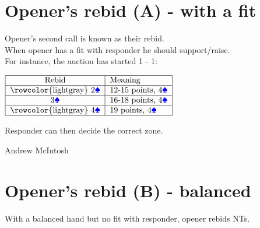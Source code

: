 \documentclass[14pt]{extarticle}
\begin{document}
\addtocounter{page}{15}
\newpage

\vspace*{\fill}
\begingroup
\centering
\section*{Opener's rebid (A) - with a fit}

\endgroup
\noindent Opener's second call is known as their rebid.\\
\noindent When opener has a fit with responder he should support/raise.\\

\noindent For instance, the auction has started 1\textcolor{red}{} - 1\textcolor{blue}{}:\\
\begin{center}
$\begin{tabular}{|c|l|}
\hline
Rebid & Meaning\\
\hline
\rowcolor{lightgray}
2\textcolor{blue}{\ding{171}} & 12-15 points, 4\textcolor{blue}{\ding{171}}\\
\hline
3\textcolor{blue}{\ding{171}} &  16-18 points, 4\textcolor{blue}{\ding{171}}\\
\hline
\rowcolor{lightgray}
4\textcolor{blue}{\ding{171}} &  19 points, 4\textcolor{blue}{\ding{171}}\\
\hline\end{tabular}$\\\end{center}
\vspace{0.15in}
\noindent Responder can then decide the correct zone.

\vspace*{\fill}
\begin{flushbottom}
 \begin{center}
 \tiny
 \textcopyright Andrew McIntosh
\end{center}
\end{flushbottom}


\newpage

\vspace*{\fill}
\begingroup
\centering

\section*{Opener's rebid (B) - balanced}
\endgroup
\noindent With a balanced hand but no fit with responder, opener rebids NTs.\\
%
%
\end{document}
